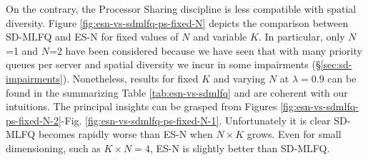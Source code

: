 On the contrary, the Processor Sharing discipline is less compatible with spatial diversity. Figure \ref{fig:esn-vs-sdmlfq-ps-fixed-N} depicts the comparison between SD-MLFQ and ES-N for fixed values of $N$ and variable $K$. In particular, only $N$=1 and $N$=2 have been considered because we have seen that with many priority queues per server and spatial diversity we incur in some impairments (\S \ref{sec:sd-impairments}). Nonetheless, results for fixed $K$ and varying $N$ at $\lambda = 0.9$ can be found in the summarizing Table \ref{tab:esn-vs-sdmlfq} and are coherent with our intuitions. The principal insights can be grasped from Figures \ref{fig:esn-vs-sdmlfq-ps-fixed-N-2}-Fig. \ref{fig:esn-vs-sdmlfq-ps-fixed-N-1}.  Unfortunately it is clear SD-MLFQ becomes rapidly worse than ES-N when $N \times K$ grows. Even for small dimensioning, such as $K \times N = 4$, ES-N is slightly better than SD-MLFQ.
